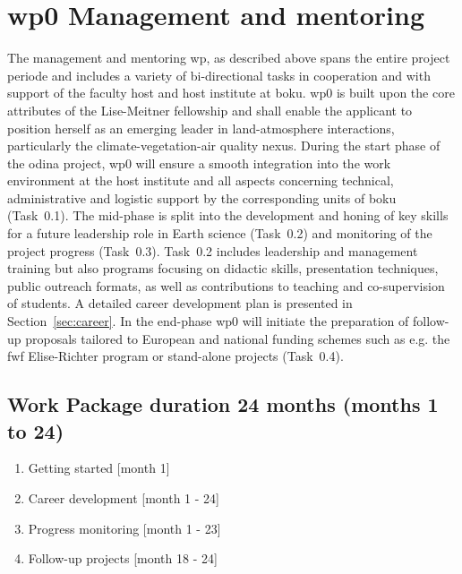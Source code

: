 \section{\gls{wp}0 Management and mentoring}
\label{sec:wp0}
The management and mentoring \gls{wp}, as described above spans the entire project periode and includes a variety of bi-directional tasks in cooperation and with support of the faculty host and host institute at \gls{boku}. \gls{wp}0 is built upon the  core attributes of the Lise-Meitner fellowship  and shall enable the applicant to position herself as an emerging leader in land-atmosphere interactions, particularly the climate-vegetation-air quality nexus. During the start phase of the \gls{odina} project, \gls{wp}0 will ensure a smooth integration into the work environment at the host institute  and all aspects concerning technical, administrative and logistic support by the corresponding units of \gls{boku} (Task~0.1). The mid-phase is split into the development and honing of key skills for a future leadership role in Earth science (Task~0.2) and monitoring of the project progress (Task~0.3). Task~0.2 includes leadership and management training but also programs focusing on didactic skills, presentation techniques, public outreach formats, as well as contributions to  teaching and co-supervision of students. A detailed career development plan is presented in Section~\ref{sec:career}. In the end-phase \gls{wp}0 will initiate the preparation of follow-up proposals tailored to European and national funding schemes such as e.g. the \gls{fwf} Elise-Richter program or stand-alone projects (Task~0.4).

\subsection*{Work Package duration 24 months (months 1 to 24)}
\begin{enumerate}[start=1,label={T0.\arabic*}]
  \itemsep0pt
\item Getting started \hfill [month 1]
\item Career development \hfill [month 1 - 24]
\item Progress monitoring \hfill [month 1 - 23]
\item Follow-up projects \hfill [month 18 - 24]
\end{enumerate}

